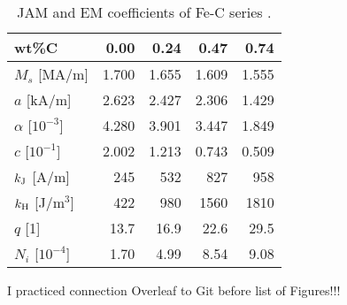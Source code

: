 \documentclass[12pt,fleqn]{article}
\def\bc{\begin{center}}
\def\ec{\end{center}}
\begin{document}










\begin{table}[h]
      \renewcommand{\thetable}{\Roman{table}}
      \caption{JAM and EM coefficients of Fe-C series \cite{TMAG}.}
      \label{C}
      \bc
      \begin{tabular}{ l r r r r }
      \hline
      wt\%C                  &   0.00 &   0.24 &   0.47 &   0.74 \\ \hline
      $M_s$ [MA/m]           &  1.700 &  1.655 &  1.609 &  1.555 \\
      $a$ [kA/m]             &  2.623 &  2.427 &  2.306 &  1.429 \\
      $\alpha$ [$10^{-3}$]   &  4.280 &  3.901 &  3.447 &  1.849 \\
      $c$ [$10^{-1}$]        &  2.002 &  1.213 &  0.743 &  0.509 \\
      $k_{\rm J}$ [A/m]      &    245 &    532 &    827 &    958 \\
      \hline
      $k_{\rm H}$ [J/m$^{3}$]&    422 &    980 &   1560 &   1810 \\
      $q$ [1]                &   13.7 &   16.9 &   22.6 &   29.5 \\
      $N_i$ [$10^{-4}$]      &   1.70 &   4.99 &   8.54 &   9.08 \\ \hline
      \end{tabular}
      \ec
\end{table}

\cleardoublepage

I practiced connection Overleaf to Git before list of Figures!!!

\listoffigures

\cleardoublepage


\end{document}
